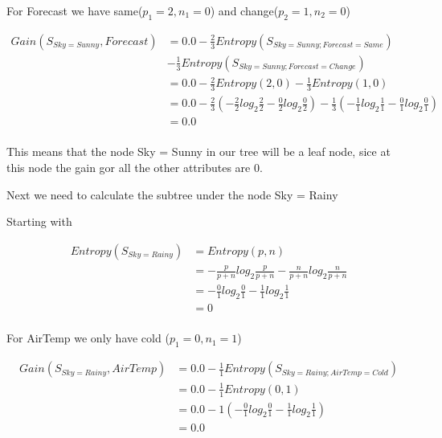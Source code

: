 \documentclass[10pt,a4paper]{article}
\begin{document}
{{{{{{{{{{For Forecast we have same($p_1=2,n_1=0$) and change($p_2=1,n_2=0$)

\begin{equation}
\begin{split}
Gain(S_{Sky=Sunny},Forecast) &= 0.0 - \frac{2}{3} Entropy(S_{Sky=Sunny;Forecast=Same} ) \\
&-
    \frac{1}{3}Entropy(S_{Sky=Sunny;Forecast=Change})\\
          &= 0.0 - \frac{2}{3} Entropy(2,0) - \frac{1}{3}Entropy(1,0)\\
          &= 0.0 - \frac{2}{3}( -\frac{2}{2} log_2\frac{2}{2} -\frac{0}{2} log_2\frac{0}{2} ) -\frac{1}{3}( -\frac{1}{1}log_2\frac{1}{1} - \frac{0}{1}log_2\frac{0}{1} )  \\
          &= 0.0 \\
\end{split}
\end{equation}

This means that the node Sky = Sunny in our tree will be a leaf node, sice at this node the gain gor all the other attributes are 0.

Next we need to calculate the subtree under the node Sky = Rainy

Starting with  

\begin{equation}
\begin{split}
Entropy(S_{Sky=Rainy}) &= Entropy(p,n) \\
                       &= -\frac{p}{p+n}log_2\frac{p}{p+n} - \frac{n}{p+n}log_2\frac{n}{p+n}  \\
                       &= -\frac{0}{1} log_2\frac{0}{1} -\frac{1}{1} log_2\frac{1}{1} \\
                       &= 0   \\
\end{split}
\end{equation}

For AirTemp we only have cold ($p_1=0,n_1=1$)

\begin{equation}
\begin{split}
Gain(S_{Sky=Rainy},AirTemp) &= 0.0 - \frac{1}{1} Entropy(S_{Sky=Rainy;AirTemp=Cold} )\\
          &= 0.0 - \frac{1}{1} Entropy(0,1) \\
          &= 0.0 - 1( -\frac{0}{1} log_2\frac{0}{1} -\frac{1}{1} log_2\frac{1}{1} )  \\
          &= 0.0 \\
\end{split}
\end{equation}

}}}}}}}}}}
\end{document}
